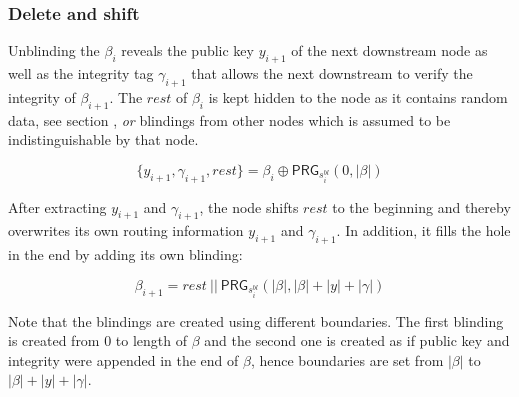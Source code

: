 \subsubsection{Delete and shift}
\label{sec:sphinx:shifting}

Unblinding the $\beta_i$ reveals the public key $y_{i+1}$ of the next downstream node as well as the integrity tag $\gamma_{i+1}$ that allows the next downstream to verify the integrity of $\beta_{i+1}$. The $rest$ of $\beta_i$ is kept hidden to the node as it contains random data, see section , \textit{or} blindings from other nodes which is assumed to be indistinguishable by that node.

$$ \{ y_{i+1}, \gamma_{i+1}, rest \} = \beta_i \oplus \textsf{PRG}_{s_i^{bl}}(0, | \beta |) $$

After extracting $y_{i+1}$ and $\gamma_{i+1}$, the node shifts $rest$ to the beginning and thereby overwrites its own routing information $y_{i+1}$ and $\gamma_{i+1}$. In addition, it fills the hole in the end by adding its own blinding:

$$ \beta_{i+1} = rest \ || \ \textsf{PRG}_{s_i^{bl}}(| \beta |, | \beta | + |y| + |\gamma|)$$

Note that the blindings are created using different boundaries. The first blinding is created from 0 to length of $\beta$ and the second one is created as if public key and integrity were appended in the end of $\beta$, hence boundaries are set from $| \beta |$ to $| \beta | + |y| + |\gamma|$.

